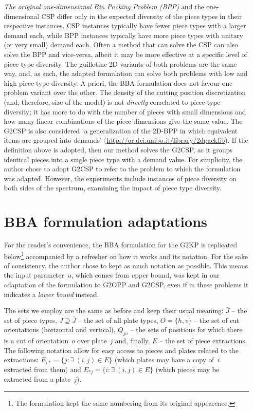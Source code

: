 \emph{The original one-dimensional Bin Packing Problem (BPP)} and the one-dimensional CSP differ only in the expected diversity of the piece types in their respective instances. CSP instances typically have fewer piece types with a larger demand each, while BPP instances typically have more piece types with unitary (or very small) demand each.
Often a method that can solve the CSP can also solve the BPP and vice-versa, albeit it may be more effective at a specific level of piece type diversity.
The guillotine 2D variants of both problems are the same way, and, as such, the adapted formulation can solve both problems with low and high piece type diversity.
A priori, the BBA formulation does not favour one problem variant over the other.
The density of the cutting position discretization (and, therefore, size of the model) is not \emph{directly} correlated to piece type diversity; it has more to do with the number of pieces with small dimensions and how many linear combinations of the piece dimensions give the same value.
The G2CSP is also considered `a generalization of the 2D-BPP in which equivalent items are grouped into demands' (\url{http://or.dei.unibo.it/library/2dpacklib}).
If the definition above is adopted, then our method solves the G2CSP, as it groups identical pieces into a single piece type with a demand value.
For simplicity, the author chose to adopt G2CSP to refer to the problem to which the formulation was adapted.
However, the experiments include instances of piece diversity on both sides of the spectrum, examining the impact of piece type diversity.

\section{BBA formulation adaptations}
\label{sec:formulation_adaptation}

For the reader's convenience, the BBA formulation for the G2KP is replicated below\footnote{The formulation kept the same numbering from its original appearence.} accompanied by a refresher on how it works and its notation.
For the sake of consistency, the author chose to kept as much notation as possible. This means the input parameter~\(u\), which comes from \emph{u}pper bound, was kept in our adaptation of the formulation to G2OPP and G2CSP, even if in these problems it indicates a \emph{lower bound} instead.

The sets we employ are the same as before and keep their usual meaning: \(\bar{J}\) -- the set of piece types, \(J \supseteq \bar{J}\) -- the set of all plate types, \(O = \{h, v\}\) -- the set of cut orientations (horizontal and vertical), \(Q_{jo}\) -- the sets of positions for which there is a cut of orientation~\(o\) over plate~\(j\) and, finally, \(E\) -- the set of piece extractions.
The following notation allow for easy access to pieces and plates related to the extractions: \(E_{i*} = \{ j : \exists~(i, j) \in E \}\) (which plates may have a copy of~\(i\) extracted from them) and \(E_{*j} = \{i : \exists~(i, j) \in E \}\) (which pieces may be extracted from a plate~\(j\)).

